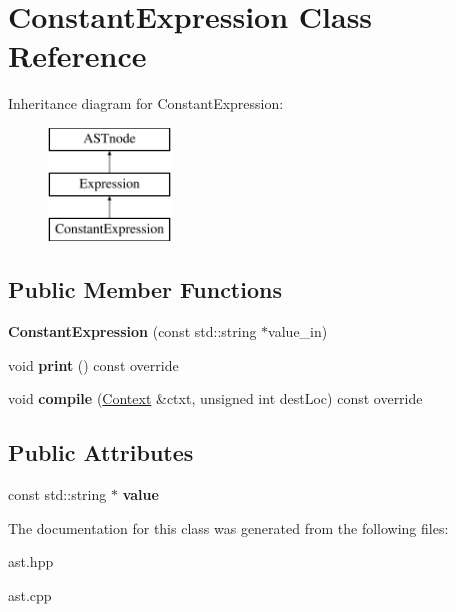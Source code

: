 \hypertarget{class_constant_expression}{}\section{Constant\+Expression Class Reference}
\label{class_constant_expression}
Inheritance diagram for Constant\+Expression\+:\begin{figure}[H]
\begin{center}
\leavevmode
\includegraphics[height=3.000000cm]{class_constant_expression}
\end{center}
\end{figure}
\subsection*{Public Member Functions}
\begin{DoxyCompactItemize}
\item 
\mbox{\label{class_constant_expression_a5a620ed4b51118e987acc7ef17b0ed28}} 
{\bfseries Constant\+Expression} (const std\+::string $\ast$value\+\_\+in)
\item 
\mbox{\label{class_constant_expression_a4039174ef6417f3a74ee6716062221d5}} 
void {\bfseries print} () const override
\item 
\mbox{\label{class_constant_expression_a833d4384e2e62bf71e8ab95ce68f1c0a}} 
void {\bfseries compile} (\hyperlink{class_context}{Context} \&ctxt, unsigned int dest\+Loc) const override
\end{DoxyCompactItemize}
\subsection*{Public Attributes}
\begin{DoxyCompactItemize}
\item 
\mbox{\label{class_constant_expression_a61f28a690adce4f13a819cb76b77d1f8}} 
const std\+::string $\ast$ {\bfseries value}
\end{DoxyCompactItemize}


The documentation for this class was generated from the following files\+:\begin{DoxyCompactItemize}
\item 
ast.\+hpp\item 
ast.\+cpp\end{DoxyCompactItemize}
